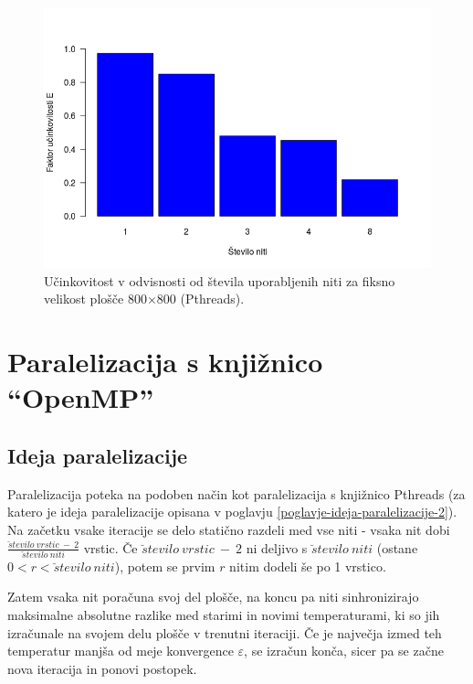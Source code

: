 \documentclass[a4paper,titlepage,11pt]{article}
\begin{document}
\begin{figure}[H]
\begin{center}
\includegraphics[scale=0.55]{graf-rezultati-2_3.png}
\caption{Učinkovitost v odvisnosti od števila uporabljenih niti za fiksno velikost plošče 800$\times$800 (Pthreads).}
\label{graf-rezultati-ucinkovitost-2}
\end{center}
\vspace{-25pt}
\end{figure}

\pagebreak

\section{Paralelizacija s knjižnico ``OpenMP''}
\label{poglavje-openmp}
\subsection{Ideja paralelizacije}
Paralelizacija poteka na podoben način kot paralelizacija s knjižnico Pthreads (za katero je ideja paralelizacije opisana v poglavju \ref{poglavje-ideja-paralelizacije-2}). Na začetku vsake iteracije se delo statično razdeli med vse niti - vsaka nit dobi $\frac{\breve{s}tevilo \ vrstic \ - \ 2}{\breve{s}tevilo \ niti}$ vrstic. Če $\breve{s}tevilo \ vrstic \ - \ 2$ ni deljivo s $\breve{s}tevilo \ niti$ (ostane $0 < r < \breve{s}tevilo \ niti$), potem se prvim $r$ nitim dodeli še po 1 vrstico.

Zatem vsaka nit poračuna svoj del plošče, na koncu pa niti sinhronizirajo maksimalne absolutne razlike med starimi in novimi temperaturami, ki so jih izračunale na svojem delu plošče v trenutni iteraciji. Če je največja izmed teh temperatur manjša od meje konvergence $\varepsilon$, se izračun konča, sicer pa se začne nova iteracija in ponovi postopek.
\end{document}
